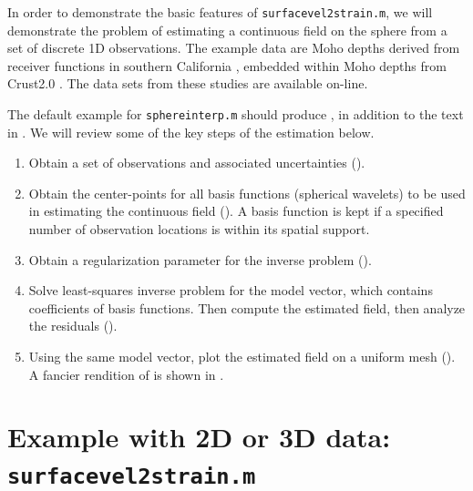 \documentclass[11pt,titlepage,fleqn]{article}
\begin{document}
In order to demonstrate the basic features of \verb+surfacevel2strain.m+, we will demonstrate the problem of estimating a continuous field on the sphere from a set of discrete 1D observations. The example data are Moho depths derived from receiver functions in southern California \citep{YanClayton2007}, embedded within Moho depths from Crust2.0 \citep{Crust2}. The data sets from these studies are available on-line.

The default example for \verb+sphereinterp.m+ should produce , in addition to the text in . We will review some of the key steps of the estimation below.
%
\begin{enumerate}
\item Obtain a set of observations and associated uncertainties ().
\item Obtain the center-points for all basis functions (spherical wavelets) to be used in estimating the continuous field (). A basis function is kept if a specified number of observation locations is within its spatial support.
\item Obtain a regularization parameter for the inverse problem ().
\item Solve  least-squares inverse problem for the model vector, which contains coefficients of basis functions. Then compute the estimated field, then analyze the residuals ().
\item Using the same model vector, plot the estimated field on a uniform mesh (). A fancier rendition of  is shown in .
\end{enumerate}


\section{Example with 2D or 3D data: {\tt surfacevel2strain.m}}
\label{sec:surfacevel2strain}
\end{document}
